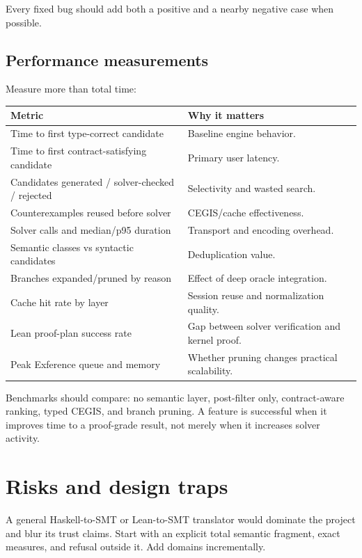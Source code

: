 \documentclass[11pt,oneside]{article}
\begin{document}
Every fixed bug should add both a positive and a nearby negative case when possible.

\subsection{Performance measurements}

Measure more than total time:

\begin{longtable}{@{}p{}p{}@{}}
\toprule
\textbf{Metric} & \textbf{Why it matters} \\
\midrule
\endhead
Time to first type-correct candidate & Baseline engine behavior. \\
Time to first contract-satisfying candidate & Primary user latency. \\
Candidates generated / solver-checked / rejected & Selectivity and wasted search. \\
Counterexamples reused before solver & CEGIS/cache effectiveness. \\
Solver calls and median/p95 duration & Transport and encoding overhead. \\
Semantic classes vs syntactic candidates & Deduplication value. \\
Branches expanded/pruned by reason & Effect of deep oracle integration. \\
Cache hit rate by layer & Session reuse and normalization quality. \\
Lean proof-plan success rate & Gap between solver verification and kernel proof. \\
Peak Exference queue and memory & Whether pruning changes practical scalability. \\
\bottomrule
\end{longtable}

Benchmarks should compare: no semantic layer, post-filter only, contract-aware ranking,
typed CEGIS, and branch pruning. A feature is successful when it improves time to a
proof-grade result, not merely when it increases solver activity.

\section{Risks and design traps}

\begin{riskbox}[title=Do not translate arbitrary source language semantics in the first version]
A general Haskell-to-SMT or Lean-to-SMT translator would dominate the project and blur
its trust claims. Start with an explicit total semantic fragment, exact measures, and
refusal outside it. Add domains incrementally.
\end{riskbox}
\end{document}
